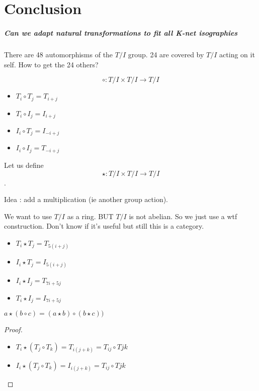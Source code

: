 \documentclass{report}
\begin{document}
\chapter{Conclusion}

\paragraph{Can we adapt natural transformations to fit all K-net isographies}
There are 48 automorphisms of the $T/I$ group. 24 are covered by $T/I$ acting on it self. How to get the 24 others?

$$\circ : T/I \times T/I \rightarrow T/I$$

\begin{itemize}
    \item $T_i \circ T_j = T_{i + j}$
    \item $T_i \circ I_j = I_{i + j}$
    \item $I_i \circ T_j = I_{-i + j}$
    \item $I_i \circ I_j = T_{-i + j}$
\end{itemize}

Let us define
$$\star : T/I \times T/I \rightarrow T/I$$.

Idea : add a multiplication (ie another group action).

We want to use $T/I$ as a ring. BUT $T/I$ is not abelian. So we just use a wtf construction. Don't know if it's useful but still this is a category.
\begin{itemize}
    \item $T_i \star T_j = T_{5(i + j)}$
    \item $I_i \star T_j = I_{5(i + j)}$
    \item $I_i \star I_j = T_{7i + 5j}$
    \item $T_i \star I_j = I_{7i + 5j}$
\end{itemize}



\begin{prop}
    $a \star (b \circ c) = (a \star b) \circ (b \star c)) $
\end{prop}
\begin{proof}
    \begin{itemize}
        \item $T_i \star (T_j \circ T_k) = T_{i(j+k)} = T_{ij}\circ T{jk}$
        \item $I_i \star (T_j \circ T_k) = I_{i(j+k)} = T_{ij}\circ T{jk}$
    \end{itemize}
\end{proof}
\newpage



\end{document}
